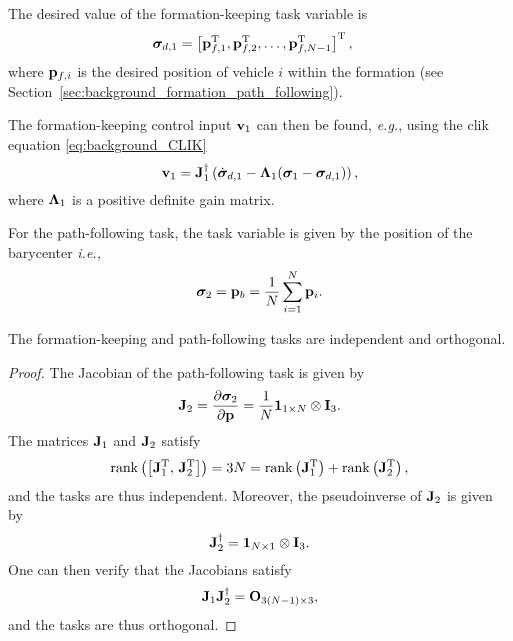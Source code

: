 The desired value of the formation-keeping task variable is
\begin{align}
    \bm{\sigma}_{d, 1} &= \left[\mathbf{p}_{f, 1}^{\mathrm{T}}, \mathbf{p}_{f, 2}^{\mathrm{T}}, \ldots, \mathbf{p}_{f, N-1}^{\mathrm{T}}\right]^{\mathrm{T}},
    \label{eq:background_NSB_formation_reference}
\end{align}
where $\mathbf{p}_{f, i}$ is the desired position of vehicle $i$ within the formation (see Section~\ref{sec:background_formation_path_following}).

The formation-keeping control input $\mathbf{v}_1$ can then be found, \emph{e.g.}, using the \gls{clik} equation \eqref{eq:background_CLIK}
\begin{equation}
    \mathbf{v}_1 = \mathbf{J}_1^{\dagger} \left(\dot{\bm{\sigma}}_{d, 1} - \bm{\Lambda}_1 (\bm{\sigma}_1 - \bm{\sigma}_{d, 1})\right),
    \label{eq:background_NSB_formation_velocity}
\end{equation}
where $\bm{\Lambda}_1$ is a positive definite gain matrix.

For the path-following task, the task variable is given by the position of the barycenter \emph{i.e.,}
\begin{equation}
    \bm{\sigma}_2 = \mathbf{p}_b = \frac{1}{N} \sum_{i=1}^{N} \mathbf{p}_i.
\end{equation}

\begin{prop}
    The formation-keeping and path-following tasks are independent and orthogonal.
\end{prop}
\begin{proof}
    The Jacobian of the path-following task is given by
    \begin{equation}
        \mathbf{J}_2 = \frac{\partial \bm{\sigma}_2}{\partial \mathbf{p}} = \frac{1}{N} \mathbf{1}_{1 \times N} \otimes \mathbf{I}_3.
    \end{equation}
    The matrices $\mathbf{J}_1$ and $\mathbf{J}_2$ satisfy
    \begin{equation}
        \operatorname*{rank} \left(\left[\mathbf{J}_1^{\mathrm{T}},\, \mathbf{J}_2^{\mathrm{T}}\right]\right) = 3N = \operatorname*{rank} \left(\mathbf{J}_1^{\mathrm{T}}\right) + \operatorname*{rank} \left(\mathbf{J}_2^{\mathrm{T}}\right),
    \end{equation}
    and the tasks are thus independent.
    Moreover, the pseudoinverse of $\mathbf{J}_2$ is given by
    \begin{equation}
        \mathbf{J}_2^{\dagger} = \mathbf{1}_{N \times 1} \otimes \mathbf{I}_3.
    \end{equation}
    One can then verify that the Jacobians satisfy
    \begin{equation}
        \mathbf{J}_1 \mathbf{J}_2^{\dagger} = \mathbf{O}_{3(N-1) \times 3},
    \end{equation}
    and the tasks are thus orthogonal.
\end{proof}

